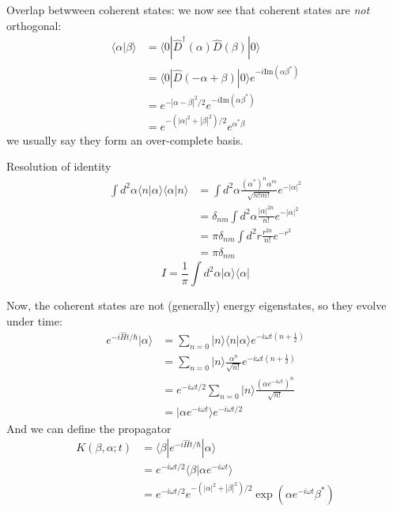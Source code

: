 Overlap betwween coherent states: we now see that coherent states are \emph{not} orthogonal:
\begin{align*}
    \langle \alpha |\beta \rangle &=\langle 0|\hat{D}^{\dagger}\left( \alpha \right) \hat{D}\left( \beta \right) |0\rangle \\
    &=\langle 0|\hat{D}\left( -\alpha +\beta \right) |0\rangle e^{-i\mathrm{Im}\left( \alpha \beta ^* \right)}\\
    &=e^{-\left| \alpha -\beta \right|^2/2}e^{-i\mathrm{Im}\left( \alpha \beta ^* \right)}\\
    &=e^{-\left( \left| \alpha \right|^2+\left| \beta \right|^2 \right) /2}e^{\alpha ^*\beta}
\end{align*}
we usually say they form an over-complete basis.

Resolution of identity
\begin{align*}
    \int{d^2\alpha \langle n|\alpha \rangle \langle \alpha |n\rangle}&=\int{d^2\alpha \frac{\left( \alpha ^* \right) ^n\alpha ^m}{\sqrt{n!m!}}e^{-\left| \alpha \right|^2}}\\
    &=\delta _{nm}\int{d^2\alpha \frac{\left| \alpha \right|^{2n}}{n!}e^{-\left| \alpha \right|^2}}\\
    &=\pi \delta _{nm}\int{d^2r\frac{r^{2n}}{n!}e^{-r^2}}\\
    &=\pi \delta _{nm}
\end{align*}
\[ I=\frac{1}{\pi}\int{d^2\alpha |\alpha \rangle \langle \alpha |}\]

Now, the coherent states are not (generally) energy eigenstates, so they evolve under time:
\begin{align*}
    e^{-i\hat{H}t/\hbar}|\alpha \rangle &=\sum_{n=0}{|n\rangle \langle n|\alpha \rangle e^{-i\omega t\left( n+\frac{1}{2} \right)}}\\
    &=\sum_{n=0}{|n\rangle \frac{\alpha ^n}{\sqrt{n!}}e^{-i\omega t\left( n+\frac{1}{2} \right)}}\\
    &=e^{-i\omega t/2}\sum_{n=0}{|n\rangle \frac{\left( \alpha e^{-i\omega t} \right) ^n}{\sqrt{n!}}}\\
    &=|\alpha e^{-i\omega t}\rangle e^{-i\omega t/2}
\end{align*}
And we can define the propagator
\begin{align*}
    K\left( \beta ,\alpha ;t \right) &=\langle \beta |e^{-i\hat{H}t/\hbar}|\alpha \rangle \\
    &=e^{-i\omega t/2}\langle \beta |\alpha e^{-i\omega t}\rangle\\
    &=e^{-i\omega t/2}e^{-\left( \left| \alpha \right|^2+\left| \beta \right|^2 \right) /2}\exp \left( \alpha e^{-i\omega t}\beta ^* \right)
\end{align*}

